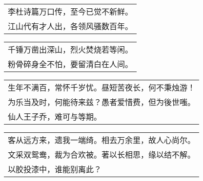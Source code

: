 \nopagebreak%
\nopagebreak%
\noindent\begin{minipage}{\linewidth}
  \vskip-3pt\begin{table}[H]
    \centering
    \begin{tabular}{@{}l@{}}
李杜诗篇万口传，至今已觉不新鲜。\\
江山代有才人出，各领风骚数百年。
    \end{tabular}
  \end{table}
\end{minipage}
\vspace{1cm}


\nopagebreak%
\nopagebreak%
\noindent\begin{minipage}{\linewidth}
  \vskip-3pt\begin{table}[H]
    \centering
    \begin{tabular}{@{}l@{}}
千锤万凿出深山，烈火焚烧若等闲。\\
粉骨碎身全不怕，要留清白在人间。
    \end{tabular}
  \end{table}
\end{minipage}
\vspace{1cm}


\nopagebreak%
\nopagebreak%
\noindent\begin{minipage}{\linewidth}
  \vskip-3pt\begin{table}[H]
    \centering
    \begin{tabular}{@{}l@{}}
生年不满百，常怀千岁忧。昼短苦夜长，何不秉烛游！\\
为乐当及时，何能待来兹？愚者爱惜费，但为後世嗤。\\
仙人王子乔，难可与等期。
    \end{tabular}
  \end{table}
\end{minipage}
\vspace{1cm}


\nopagebreak%
\nopagebreak%
\noindent\begin{minipage}{\linewidth}
  \vskip-3pt\begin{table}[H]
    \centering
    \begin{tabular}{@{}l@{}}
客从远方来，遗我一端绮。相去万余里，故人心尚尔。\\
文采双鸳鸯，裁为合欢被。著以长相思，缘以结不解。\\
以胶投漆中，谁能别离此？
    \end{tabular}
  \end{table}
\end{minipage}
\vspace{1cm}


